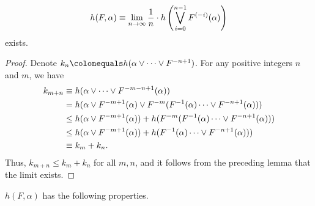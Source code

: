 \documentclass[10pt,twoside,draft]{book}
\begin{document}
\begin{proposition}
  \begin{equation*}
    h(F,\alpha) \equiv \lim\limits_{n \to \infty} \frac{1}{n} \cdot h\left (  \bigvee\limits_{i=0}^{n-1} F^{(-i)}(\alpha)  \right )
  \end{equation*}
  exists.
  \label{prop:entropy-limit}
  \begin{proof}
    Denote $k_n \ceq h(\alpha \vee \cdots \vee \itr{F}{-n+1})$.
    For any positive integers $n$ and $m$, we have
    \begin{align*}
      k_{m+n} &\equiv h(\alpha \vee \cdots \vee F^{-m-n+1}(\alpha))   \\
      &= h(\alpha \vee F^{-m+1}(\alpha) \vee F^{-m}(F^{-1}(\alpha) \cdots \vee F^{-n+1}(\alpha)))   \\
      &\leq  h(\alpha \vee F^{-m+1}(\alpha)) + h(F^{-m}(F^{-1}(\alpha) \cdots \vee F^{-n+1}(\alpha)))   \\
      &\leq  h(\alpha \vee F^{-m+1}(\alpha)) + h(F^{-1}(\alpha) \cdots \vee F^{-n+1}(\alpha)))   \\
      &\equiv k_m + k_n.
    \end{align*}
    Thus, $k_{m+n} \leq k_m + k_n$ for all $m,n$, and it follows from the preceding lemma that the limit exists.
  \end{proof}
\end{proposition}
$h(F, \alpha)$ has the following properties.
\end{document}
